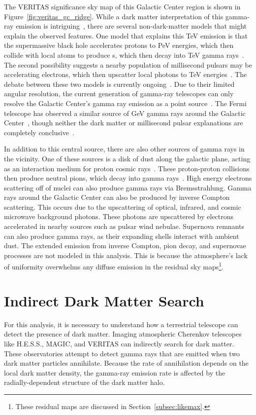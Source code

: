   The VERITAS significance sky map of this Galactic Center region is shown in Figure~\ref{fig:veritas_gc_ridge}.
  While a dark matter interpretation of this gamma-ray emission is intriguing~\cite{gc_pnt_is_dm1,gc_pnt_is_dm2}, there are several non-dark-matter models that might explain the observed features.
  One model that explains this TeV emission is that the supermassive black hole accelerates protons to PeV energies, which then collide with local atoms to produce \Ppizero{}s, which then decay into TeV gamma rays~\cite{gc_pevatron}.
  The second possibility suggests a nearby population of millisecond pulsars may be accelerating electrons, which then upscatter local photons to TeV energies~\cite{gc_pulsars,gc_pnt_is_not_dm2,gc_pnt_is_not_dm3}.
  The debate between these two models is currently ongoing~\cite{gc_pev_or_pwn}.
  Due to their limited angular resolution, the current generation of gamma-ray telescopes can only resolve the Galactic Center's gamma ray emission as a point source~\cite{VeritasGCRidge2015,gc_pointsrc_hess}.
  The Fermi telescope has observed a similar source of GeV gamma rays around the Galactic Center~\cite{gc_fermi_dm}, though neither the dark matter or millisecond pulsar explanations are completely conclusive~\cite{fermi_gc_pulsar_vs_dm,hoopergc}.
  
  In addition to this central source, there are also other sources of gamma rays in the vicinity.
  One of these sources is a disk of dust along the galactic plane, acting as an interaction medium for proton cosmic rays~\cite{diffusegamma1989}.
  These proton-proton collisions then produce neutral pions, which decay into gamma rays~\cite{hess_gc_diffuse}.
  High energy electrons scattering off of nuclei can also produce gamma rays via Bremsstrahlung.
  Gamma rays around the Galactic Center can also be produced by inverse Compton scattering.
  This occurs due to the upscattering of optical, infrared, and cosmic microwave background photons.
  These photons are upscattered by electrons accelerated in nearby sources such as pulsar wind nebulae.
  Supernova remnants can also produce gamma rays, as their expanding shells interact with ambient dust. 
  The extended emission from inverse Compton, pion decay, and supernovae processes are not modeled in this analysis.
  This is because the atmosphere's lack of uniformity overwhelms any diffuse emission in the residual sky maps\footnote{These residual maps are discussed in Section~\ref{subsec:likemax}.}.


\section{Indirect Dark Matter Search}
  For this analysis, it is necessary to understand how a terrestrial telescope can detect the presence of dark matter.
  Imaging atmospheric Cherenkov telescopes like H.E.S.S., MAGIC, and VERITAS can indirectly search for dark matter.
  These observatories attempt to detect gamma rays that are emitted when two dark matter particles annihilate.
  Because the rate of annihilation depends on the local dark matter density, the gamma-ray emission rate is affected by the radially-dependent structure of the dark matter halo.

